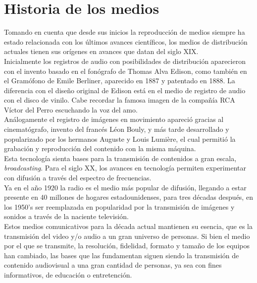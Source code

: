 \section{Historia de los medios}
Tomando en cuenta que desde sus inicios la reproducción de medios siempre ha estado relacionada con los últimos avances científicos, los medios de distribución actuales tienen sus orígenes en avances que datan  del siglo XIX.\\

\enlargethispage{2\baselineskip}
Inicialmente los registros de audio con posibilidades de distribución aparecieron con el invento basado en el fonógrafo de Thomas Alva Edison, como también en el Gramófono de Emile Berliner, aparecido en 1887 y patentado en 1888. La diferencia con el diseño original de Edison está en el medio de registro de audio con el disco de vinilo. Cabe recordar la famosa imagen de la compañía RCA Víctor del Perro escuchando la voz del amo.\\

Análogamente el registro de imágenes en movimiento apareció gracias al cinematógrafo, invento del francés Léon Bouly, y más tarde desarrollado y popularizado por los hermanos Auguste y Louis Lumière, el cual permitió la grabación y reproducción del contenido con la misma máquina.\\

Esta tecnología sienta bases para la transmisión de contenidos a gran escala, \textit{broadcasting}. Para el siglo XX, los avances en tecnología permiten experimentar con difusión a través del espectro de frecuencias.\\

 Ya en el año 1920 la radio es el medio más popular de difusión, llegando a estar presente en 40 millones de hogares estadounidenses, para tres décadas después, en los 1950’s ser reemplazada en popularidad por la transmisión de imágenes y sonidos a través de la naciente televisión.\\

	Estos medios comunicativos para la década actual mantienen su esencia, que es la transmisión del video y/o audio a un gran universo de personas. Si bien el medio por el que se transmite, la resolución, fidelidad, formato y tamaño de los equipos han cambiado, las bases que las fundamentan siguen siendo la transmisión de contenido audiovisual a una gran cantidad de personas, ya sea con fines informativos, de educación o entretención.\\
	
